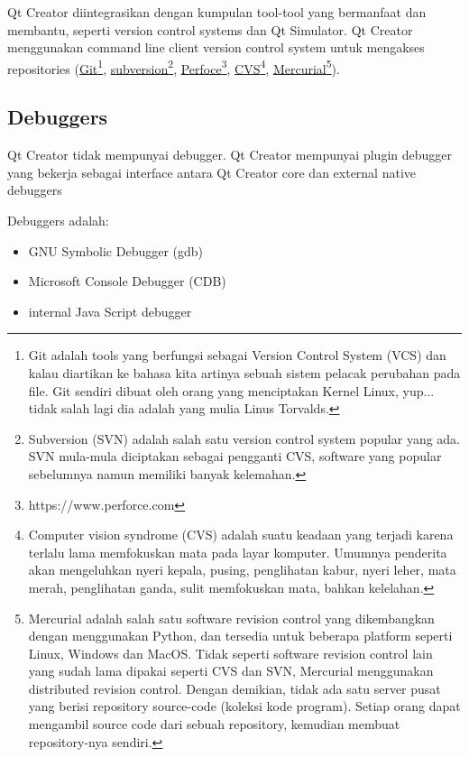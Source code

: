 Qt Creator diintegrasikan dengan kumpulan tool-tool yang bermanfaat dan
membantu, seperti version control systems dan Qt Simulator. Qt Creator
menggunakan command line client version control system untuk mengakses
repositories (\href{https://git-scm.com/}{Git}\footnote{Git adalah tools yang berfungsi sebagai Version Control System (VCS) dan kalau diartikan ke bahasa kita artinya sebuah sistem pelacak perubahan pada file. Git sendiri dibuat oleh orang yang menciptakan Kernel Linux, yup... tidak salah lagi dia adalah yang mulia Linus Torvalds.},
\href{https://subversion.apache.org/}{subversion}\footnote{Subversion (SVN) adalah salah satu version control system popular yang ada. SVN mula-mula diciptakan sebagai pengganti CVS, software yang popular sebelumnya namun memiliki banyak kelemahan.},
\href{https://www.perforce.com}{Perfoce}\footnote{https://www.perforce.com},
\href{www.nongnu.org/cvs/}{CVS}\footnote{Computer vision syndrome (CVS) adalah suatu keadaan yang terjadi karena terlalu lama memfokuskan mata pada layar komputer. Umumnya penderita akan mengeluhkan nyeri kepala, pusing, penglihatan kabur, nyeri leher, mata merah, penglihatan ganda, sulit memfokuskan mata, bahkan kelelahan.},
\href{https://www.mercurial-scm.org}{Mercurial}\footnote{Mercurial adalah salah satu software revision control yang dikembangkan dengan menggunakan Python, dan tersedia untuk beberapa platform seperti Linux, Windows dan MacOS.  Tidak seperti software revision control lain yang sudah lama dipakai seperti CVS dan SVN, Mercurial menggunakan distributed revision control.  Dengan demikian, tidak ada satu server pusat yang berisi repository source-code (koleksi kode program).  Setiap orang dapat mengambil source code dari sebuah repository, kemudian membuat repository-nya sendiri.}).

\subsection{Debuggers}\label{debuggers}

Qt Creator tidak mempunyai debugger. Qt Creator mempunyai plugin
debugger yang bekerja sebagai interface antara Qt Creator core dan
external native debuggers

Debuggers adalah:

\begin{itemize}

\item
  GNU Symbolic Debugger (gdb)
\item
  Microsoft Console Debugger (CDB)
\item
  internal Java Script debugger
\end{itemize}

